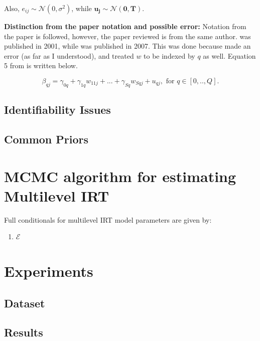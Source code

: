 \documentclass[12pt]{article}
\begin{document}
Also, $e_{ij} \sim \mathcal{N}(0, \sigma^2)$, while $\boldsymbol{u_j} \sim \mathcal{N}(\boldsymbol{0}, \boldsymbol{T})$.

\textbf{Distinction from the paper notation and possible error:}
Notation from the paper \cite{fox2007multilevel} is followed, however, the paper reviewed is \cite{fox2001bayesian} from the same author. \cite{fox2001bayesian} was published in 2001, while \cite{fox2007multilevel} was published in 2007. This was done because \cite{fox2001bayesian} made an error (as far as I understood), and treated $w$ to be indexed by $q$ as well. Equation 5 from \cite{fox2001bayesian} is written below.

\begin{equation*}
    \beta_{qj} = \gamma_{0q} + \gamma_{1q}w_{11j} + ... + \gamma_{Sq}w_{Sqj} + u_{qj}, \text{ for } q\in [0,.., Q].
\end{equation*}

\subsection{Identifiability Issues}

\subsection{Common Priors}

\section{MCMC algorithm for estimating Multilevel IRT}
Full conditionals for multilevel IRT model parameters are given by:
\begin{enumerate}
    \item $\mathcal{E}$
\end{enumerate}

\section{Experiments}
\subsection{Dataset}

\subsection{Results}







\end{document}
